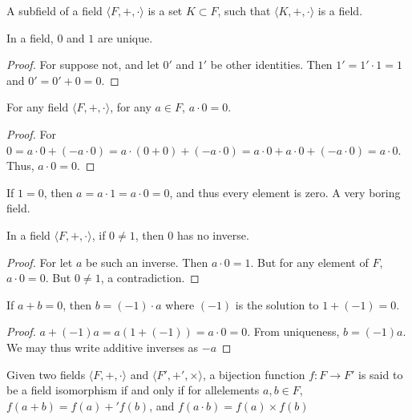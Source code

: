         \begin{definition}
        A subfield of a field $\langle F,+,\cdot \rangle$ is a set $K\subset F$, such that $\langle K, +,\cdot \rangle$ is a field.
        \end{definition}
        \begin{theorem}
        In a field, $0$ and $1$ are unique.
        \end{theorem}
        \begin{proof}
        For suppose not, and let $0'$ and $1'$ be other identities. Then $1'=1'\cdot 1 = 1$ and $0'=0'+0=0$.
        \end{proof}
        \begin{theorem}
        For any field $\langle F,+,\cdot \rangle$, for any $a\in F$, $a\cdot 0 = 0$.
        \end{theorem}
        \begin{proof}
        For $0 = a\cdot 0 + (-a\cdot 0) = a\cdot(0+0) +(-a\cdot 0) = a\cdot 0 + a\cdot 0 + (-a\cdot 0) = a\cdot 0$. Thus, $a\cdot 0 = 0$.
        \end{proof}
        \begin{remark}
        If $1=0$, then $a=a\cdot 1 = a\cdot 0 = 0$, and thus every element is zero. A very boring field.
        \end{remark}
        \begin{corollary}
        In a field $\langle F, +,\cdot \rangle$, if $0\ne 1$, then $0$ has no inverse.
        \end{corollary}
        \begin{proof}
        For let $a$ be such an inverse. Then $a\cdot 0 = 1$. But for any element of $F$, $a \cdot 0 = 0$. But $0\ne 1$, a contradiction.
        \end{proof}
        \begin{theorem}
        If $a+b = 0$, then $b= (-1)\cdot a$ where $(-1)$ is the solution to $1+(-1)=0$.
        \end{theorem}
        \begin{proof}
        $a+(-1)a = a(1+(-1)) = a\cdot 0 = 0$. From uniqueness, $b=(-1)a$. We may thus write additive inverses as $-a$
        \end{proof}
        \begin{definition}
        Given two fields $\langle F,+,\cdot \rangle$ and $\langle F', +',\times \rangle$, a bijection function $f:F\rightarrow F'$ is said to be a field isomorphism if and only if for allelements $a,b\in F$, $f(a+b)=f(a)+'f(b)$, and $f(a\cdot b) = f(a)\times f(b)$
        \end{definition}
